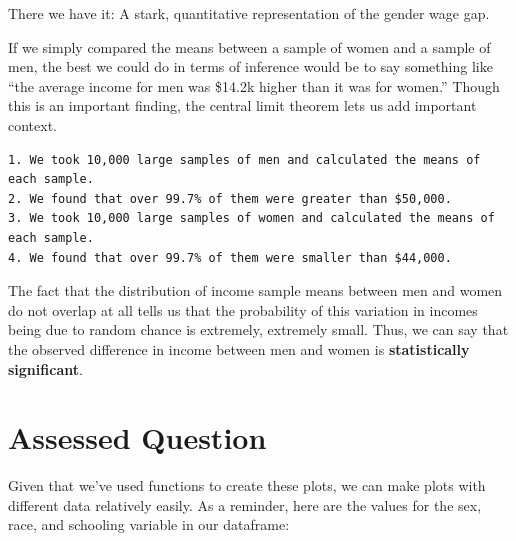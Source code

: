 \documentclass[
  letterpaper,
  DIV=11,
  numbers=noendperiod]{scrreprt}
\begin{document}
There we have it: A stark, quantitative representation of the gender
wage gap.

If we simply compared the means between a sample of women and a sample
of men, the best we could do in terms of inference would be to say
something like ``the average income for men was \$14.2k higher than it
was for women.'' Though this is an important finding, the central limit
theorem lets us add important context.

\begin{verbatim}
1. We took 10,000 large samples of men and calculated the means of each sample.
2. We found that over 99.7% of them were greater than $50,000. 
3. We took 10,000 large samples of women and calculated the means of each sample.
4. We found that over 99.7% of them were smaller than $44,000.
\end{verbatim}

The fact that the distribution of income sample means between men and
women do not overlap at all tells us that the probability of this
variation in incomes being due to random chance is extremely, extremely
small. Thus, we can say that the observed difference in income between
men and women is \textbf{statistically significant}.


\hypertarget{assessed-question-4}{%
\chapter{Assessed Question}\label{assessed-question-4}}

Given that we've used functions to create these plots, we can make plots
with different data relatively easily. As a reminder, here are the
values for the sex, race, and schooling variable in our dataframe:
\end{document}
